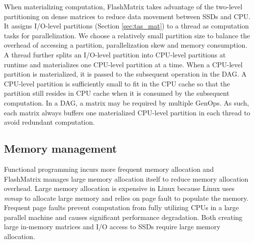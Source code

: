 
When materializing computation, FlashMatrix takes advantage of the two-level
partitioning on dense matrices to reduce data movement between SSDs and CPU.
It assigns I/O-level partitions (Section \ref{sec:tas_mat}) to a thread as
computation tasks for parallelization. We choose a relatively small partition
size to balance the overhead of accessing a partition, parallelization skew
and memory consumption. A thread further splits an I/O-level partition into
CPU-level partitions at runtime and materializes one CPU-level partition at
a time. When a CPU-level partition is materialized, it is passed to the
subsequent operation in the DAG. A CPU-level partition is sufficiently small
to fit in the CPU cache so that the partition still resides in CPU cache when
it is consumed by the subsequent computation. In a DAG, a matrix may be
required by multiple GenOps. As such, each matrix always buffers one materialized
CPU-level partition in each thread to avoid redundant computation.



\subsection{Memory management} \label{sec:mem}
Functional programming incurs more frequent memory allocation and FlashMatrix
manages large memory allocation itself to reduce memory allocation overhead.
Large memory allocation is expensive in Linux because Linux uses \textit{mmap}
to allocate large memory and relies on page fault to
populate the memory. Frequent page faults prevent computation from fully
utilizing CPUs in a large parallel machine and causes significant performance
degradation. Both creating large in-memory matrices and I/O access to SSDs
require large memory allocation.

